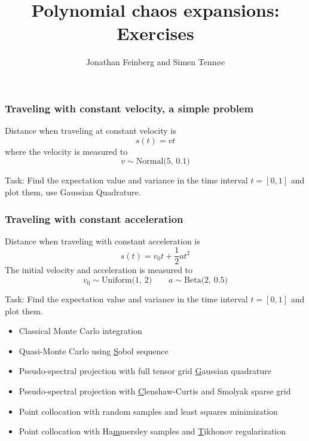 \documentclass{beamer}
\title{Polynomial chaos expansions: Exercises}
\author{Jonathan Feinberg and Simen Tennøe}
\begin{document}
\begin{frame}
  \maketitle
\end{frame}


\begin{frame}
\frametitle{Traveling with constant velocity, a simple problem}
 Distance when traveling at constant velocity is
\[s(t) = vt\]
\pause
where the velocity is measured to
\[v \sim \text{Normal(5, 0.1)}\]
\pause
\begin{alert}{Task:}
 Find the expectation value and variance in the time interval $t=[0,1]$  and plot them, use Gaussian Quadrature.
\end{alert}

\end{frame}

\begin{frame}
\frametitle{Traveling with constant acceleration}
\scriptsize
 Distance when traveling with constant acceleration is
 \[s(t) = v_0t + \frac{1}{2}at^2\]
\pause
The initial velocity and acceleration is measured to
\[v_0 \sim \text{Uniform(1, 2)} \qquad a \sim \text{Beta(2, 0.5)}\]
\pause
\begin{alert}{Task:}
Find the expectation value and variance in the time interval $t=[0,1]$  and plot them.
\begin{itemize}
    \item Classical Monte Carlo integration
    \item Quasi-Monte Carlo using \underline{S}obol sequence
    \item Pseudo-spectral projection with full tensor grid \underline{G}aussian quadrature
    \item Pseudo-spectral projection with \underline{C}lenshaw-Curtis and Smolyak sparse grid
    \item Point collocation with random samples and least squares
        minimization
    \item Point collocation with Ha\underline{m}mersley samples and
        \underline{T}ikhonov regularization
\end{itemize}
\end{alert}
\end{frame}
\end{document}
